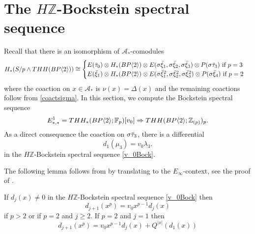 
\section{The $H\mathbb{Z}$-Bockstein spectral sequence}
Recall that there is an isomorphism of $\mathcal{A}_*$-comodules
\[
H_*(S/p\wedge THH(BP\langle 2 \rangle)) \cong 
	\begin{cases} 
		E(\bar{\tau}_0)\otimes H_*(BP\langle 2 \rangle)\otimes E(\sigma \bar{\xi}_1,\sigma \bar{\xi}_2,\sigma \bar{\xi}_3)\otimes P(\sigma \bar{\tau}_3) \text{ if } p=3 \\
		E(\bar{\xi}_1)\otimes H_*(BP\langle 2 \rangle)\otimes E(\sigma \bar{\xi}_1^2,\sigma \bar{\xi}_2^2,\sigma \bar{\xi}_3^2)\otimes P(\sigma \bar{\xi}_4) \text{ if }p=2 
	\end{cases} 
\]
where the coaction on $x\in \mathcal{A}_*$ is $\nu(x)=\Delta(x)$ and the remaining coactions follow from \eqref{coactsigma}.
In this section, we compute the Bockstein spectral sequence
\begin{equation}\label{v_0Bock} 
E^1_{*,*}=THH_*(BP\langle 2 \rangle;\mathbb{F}_p)[v_0]\Rightarrow THH(BP\langle 2 \rangle;\mathbb{Z}_{(p)})_p.
\end{equation}
As a direct consequence the coaction on  $\sigma \bar{\tau}_3$, there is a differential
\begin{equation}
d_1(\mu_3) = v_0\lambda_3. 
\end{equation}
in the $H\mathbb{Z}$-Bockstein spectral sequence \eqref{v_0Bock}.

The following lemma follows from \cite[Prop. 6.8]{May70} by translating to the $E_{\infty}$-context, see the proof of \cite[Lem. 3.2]{AHL}. 
\begin{lem}
	If $d_j(x)\ne 0$ in the $H\mathbb{Z}$-Bockstein spectral sequence \eqref{v_0Bock} then 
	\[
	d_{j+1}(x^p) = v_0x^{p-1}d_j(x)
	\]
	if $p>2$ or if $p=2$ and $j\geq 2$. If $p=2$ and $j=1$ then 
	\[
	d_{j+1}(x^p) = v_0x^{p-1}d_j(x)+Q^{|x|}(d_1(x))
	\]
\end{lem}

